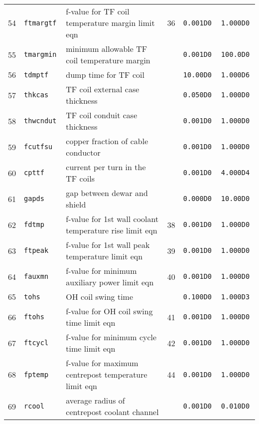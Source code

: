 \documentclass[11pt,a4paper]{report}
\begin{document}
\begin{table}[tbph]
\begin{center}
\begin{tabular}{||c|l|l|c|c|c||}
54  & \tt ftmargtf    & f-value for TF coil temperature margin limit eqn        & 36        & \tt 0.001D0  & \tt 1.000D0 \\
55  & \tt tmargmin    & minimum allowable TF coil temperature margin            &           & \tt 0.001D0  & \tt 100.0D0 \\
56  & \tt tdmptf      & dump time for TF coil                                   &           & \tt 10.00D0  & \tt 1.000D6 \\
57  & \tt thkcas      & TF coil external case thickness                         &           & \tt 0.050D0  & \tt 1.000D0 \\
58  & \tt thwcndut    & TF coil conduit case thickness                          &           & \tt 0.001D0  & \tt 1.000D0 \\
59  & \tt fcutfsu     & copper fraction of cable conductor                      &           & \tt 0.001D0  & \tt 1.000D0 \\
60  & \tt cpttf       & current per turn in the TF coils                        &           & \tt 0.001D0  & \tt 4.000D4 \\
61  & \tt gapds       & gap between dewar and shield                            &           & \tt 0.000D0  & \tt 10.00D0 \\
62  & \tt fdtmp       & f-value for 1st wall coolant temperature rise limit eqn & 38        & \tt 0.001D0  & \tt 1.000D0 \\
63  & \tt ftpeak      & f-value for 1st wall peak temperature limit eqn         & 39        & \tt 0.001D0  & \tt 1.000D0 \\
64  & \tt fauxmn      & f-value for minimum auxiliary power limit eqn           & 40        & \tt 0.001D0  & \tt 1.000D0 \\
65  & \tt tohs        & OH coil swing time                                      &           & \tt 0.100D0  & \tt 1.000D3 \\
66  & \tt ftohs       & f-value for OH coil swing time limit eqn                & 41        & \tt 0.001D0  & \tt 1.000D0 \\
67  & \tt ftcycl      & f-value for minimum cycle time limit eqn                & 42        & \tt 0.001D0  & \tt 1.000D0 \\
68  & \tt fptemp      & f-value for maximum centrepost temperature limit eqn    & 44        & \tt 0.001D0  & \tt 1.000D0 \\
69  & \tt rcool	      & average radius of centrepost coolant channel            &           & \tt 0.001D0  & \tt 0.010D0 \\

\end{tabular}
\end{center}
\end{table}
\end{document}
